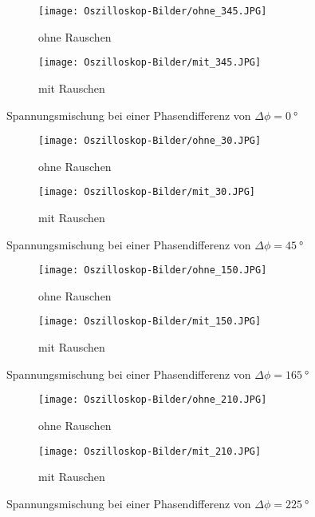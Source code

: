 \begin{figure}[h!]
	\begin{subfigure}{0.5\textwidth}
		\texttt{[image: Oszilloskop-Bilder/ohne\_345.JPG]}
		\caption{ohne Rauschen}
	\end{subfigure}
	\begin{subfigure}{0.5\textwidth}
		\texttt{[image: Oszilloskop-Bilder/mit\_345.JPG]}
		\caption{mit Rauschen}
	\end{subfigure}
	\caption{Spannungsmischung bei einer Phasendifferenz von $\Delta\phi = \SI{0}{\degree}$}
	\label{Verschiebung_0}
\end{figure}

\begin{figure}[h!]
	\begin{subfigure}{0.5\textwidth}
		\texttt{[image: Oszilloskop-Bilder/ohne\_30.JPG]}
		\caption{ohne Rauschen}
	\end{subfigure}
	\begin{subfigure}{0.5\textwidth}
		\texttt{[image: Oszilloskop-Bilder/mit\_30.JPG]}
		\caption{mit Rauschen}
	\end{subfigure}
\caption{Spannungsmischung bei einer Phasendifferenz von $\Delta\phi = \SI{45}{\degree}$}
\end{figure}

\begin{figure}
	\begin{subfigure}{0.5\textwidth}
		\texttt{[image: Oszilloskop-Bilder/ohne\_150.JPG]}
		\caption{ohne Rauschen}
	\end{subfigure}
	\begin{subfigure}{0.5\textwidth}
		\texttt{[image: Oszilloskop-Bilder/mit\_150.JPG]}
		\caption{mit Rauschen}
	\end{subfigure}
\caption{Spannungsmischung bei einer Phasendifferenz von $\Delta\phi = \SI{165}{\degree}$}
\end{figure}

\begin{figure}
	\begin{subfigure}{0.5\textwidth}
		\texttt{[image: Oszilloskop-Bilder/ohne\_210.JPG]}
		\caption{ohne Rauschen}
	\end{subfigure}
	\begin{subfigure}{0.5\textwidth}
		\texttt{[image: Oszilloskop-Bilder/mit\_210.JPG]}
		\caption{mit Rauschen}
	\end{subfigure}
\caption{Spannungsmischung bei einer Phasendifferenz von $\Delta\phi = \SI{225}{\degree}$}
\end{figure}

